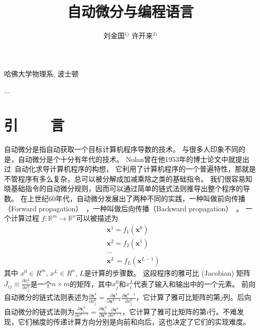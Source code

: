 \documentclass[A4,twoside,fontset=ubuntu,UTF8]{ctexart}
\newcommand{\vx}{{\mathbf{x}}}
\begin{document}
\apsname

\title{自动微分与编程语言 \fivestar}%

\author{刘金国$^{1)}$ \quad 许开来$^{2)}$}

\address{1)}{哈佛大学物理系, 波士顿 }
\address{2)}{...}





\cfund{}




{}\baselineskip
\section{引~~~~言}
自动微分是指自动获取一个目标计算机程序导数的技术。
与很多人印象不同的是，自动微分是个十分有年代的技术。
Nolan曾在他1953年的博士论文中就提出过~\cite{Nolan1953}自动化求导计算机程序的构想，
它利用了计算机程序的一个普遍特性，那就是不管程序有多么复杂，总可以被分解成加减乘除之类的基础指令。
我们很容易知晓基础指令的自动微分规则，因而可以通过简单的链式法则推导出整个程序的导数。
    在上世纪60年代，自动微分发展出了两种不同的实践，一种叫做前向传播（Forward propagation）~\cite{Wengert1964}，一种叫做后向传播（Backward propagation）~\cite{Boltyanski1960}。
一个计算过程 $f : \mathbb{R}^m \rightarrow \mathbb{R}^n$可以被描述为
\begin{align*}
    &\vx^1 = f_1(\vx^0)\\
    &\vx^2 = f_2(\vx^1)\\
    &\ldots\\
    &\vx^L = f_L(\vx^{L-1})
\end{align*}
其中 $x^0\in R^m$, $x^L\in R^n$, $L$是计算的步骤数。
这段程序的雅可比 (Jacobian) 矩阵$J_{ij} \equiv \frac{\partial x^L_i}{\partial x_j^0}$是一个$n\times m$的矩阵，其中$x_j^0$和$x_i^L$代表了输入和输出中的一个元素。
前向自动微分的链式法则表述为$\frac{\partial \vx^k}{\partial x^0_j} = \frac{\partial \vx^k}{\partial \vx^{k-1}}\frac{\partial \vx^{k-1}}{\partial x^0_j}$，它计算了雅可比矩阵的第$j$列。后向自动微分的链式法则为$\frac{\partial \vx^L_i}{\partial x^{k-1}} = \frac{\partial \vx^L_i}{\partial \vx^{k}}\frac{\partial \vx^{k}}{\partial x^{k-1}}$，它计算了雅可比矩阵的第$i$行。不难发现，它们梯度的传递计算方向分别是向前和向后，这也决定了它们的实现难度。
\end{document}

